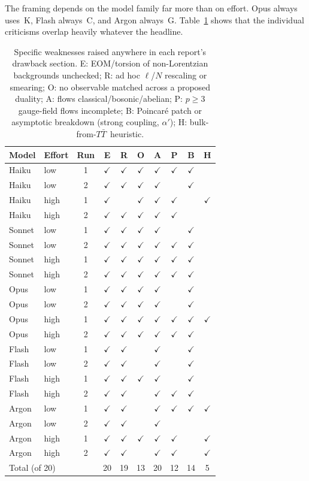 \documentclass[11pt,a4paper]{article}
\newcommand{\TTbar}{$T\bar T$}
\newcommand{\yes}{$\checkmark$}
\begin{document}
The framing depends on the model family far more than on effort. Opus always uses~K, Flash always~C, and Argon always~G. Table~\ref{tab:issues} shows that the individual criticisms overlap heavily whatever the headline.

\begin{table}[h]
\centering
\caption{Specific weaknesses raised anywhere in each report's drawback section. E: EOM/torsion of non-Lorentzian backgrounds unchecked; R: ad hoc $\ell$/$N$ rescaling or smearing; O: no observable matched across a proposed duality; A: flows classical/bosonic/abelian; P: $p\ge3$ gauge-field flows incomplete; B: Poincar\'e patch or asymptotic breakdown (strong coupling, $\alpha'$); H: bulk-from-\TTbar\ heuristic.}
\label{tab:issues}
\small
\begin{tabular}{llc ccccccc}
\toprule
Model & Effort & Run & E & R & O & A & P & B & H\\
\midrule
Haiku  & low  & 1 & \yes & \yes & \yes & \yes & \yes & \yes & \\
Haiku  & low  & 2 & \yes & \yes & \yes & \yes &      & \yes & \\
Haiku  & high & 1 & \yes &      & \yes & \yes & \yes &      & \yes\\
Haiku  & high & 2 & \yes & \yes & \yes & \yes & \yes &      & \\
Sonnet & low  & 1 & \yes & \yes & \yes & \yes &      & \yes & \\
Sonnet & low  & 2 & \yes & \yes & \yes & \yes & \yes & \yes & \\
Sonnet & high & 1 & \yes & \yes & \yes & \yes & \yes & \yes & \\
Sonnet & high & 2 & \yes & \yes & \yes & \yes & \yes & \yes & \\
Opus   & low  & 1 & \yes & \yes & \yes & \yes &      & \yes & \\
Opus   & low  & 2 & \yes & \yes & \yes & \yes &      & \yes & \\
Opus   & high & 1 & \yes & \yes & \yes & \yes & \yes & \yes & \yes\\
Opus   & high & 2 & \yes & \yes & \yes & \yes & \yes & \yes & \\
Flash  & low  & 1 & \yes & \yes &      & \yes &      & \yes & \\
Flash  & low  & 2 & \yes & \yes &      & \yes &      & \yes & \\
Flash  & high & 1 & \yes & \yes & \yes & \yes &      & \yes & \\
Flash  & high & 2 & \yes & \yes &      & \yes & \yes & \yes & \\
Argon  & low  & 1 & \yes & \yes &      & \yes & \yes & \yes & \yes\\
Argon  & low  & 2 & \yes & \yes &      & \yes &      &      & \\
Argon  & high & 1 & \yes & \yes & \yes & \yes & \yes &      & \yes\\
Argon  & high & 2 & \yes & \yes &      & \yes & \yes &      & \yes\\
\midrule
\multicolumn{3}{l}{Total (of 20)} & 20 & 19 & 13 & 20 & 12 & 14 & 5\\
\bottomrule
\end{tabular}
\end{table}
\end{document}
